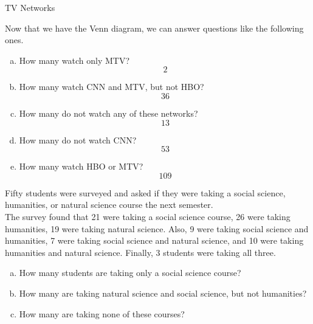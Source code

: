 \begin{example}[https://www.youtube.com/watch?v=wOU7QC3X3Eo]{TV Networks}
\begin{center}
\begin{tikzpicture}
  
  
  
  
\end{tikzpicture}
\end{center}

Now that we have the Venn diagram, we can answer questions like the following ones.

\begin{enumerate}[(a)]
\item How many watch only MTV?
\[2\]
\item How many watch CNN and MTV, but not HBO?
\[36\]
\item How many do not watch any of these networks?
\[13\]
\item How many do not watch CNN?
\[53\]
\item How many watch HBO or MTV?
\[109\]
\end{enumerate}

\end{example}

\begin{try}
Fifty students were surveyed and asked if they were taking a social science, humanities, or natural science course the next semester.\\

The survey found that 21 were taking a social science course, 26 were taking humanities, 19 were taking natural science.  Also, 9 were taking social science and humanities, 7 were taking social science and natural science, and 10 were taking humanities and natural science.  Finally, 3 students were taking all three.

\begin{enumerate}[(a)]
\item How many students are taking only a social science course?
\item How many are taking natural science and social science, but not humanities?
\item How many are taking none of these courses?
\end{enumerate}
\end{try}

